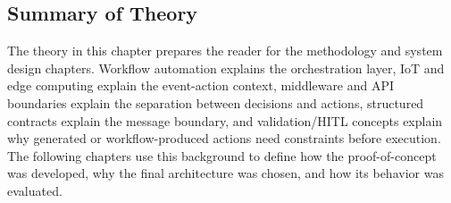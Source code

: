 \subsection{Summary of Theory}\label{subsec:theory-summary}

The theory in this chapter prepares the reader for the methodology and system design chapters. Workflow automation explains the orchestration layer, IoT and edge computing explain the event-action context, middleware and API boundaries explain the separation between decisions and actions, structured contracts explain the message boundary, and validation/HITL concepts explain why generated or workflow-produced actions need constraints before execution. The following chapters use this background to define how the proof-of-concept was developed, why the final architecture was chosen, and how its behavior was evaluated.
